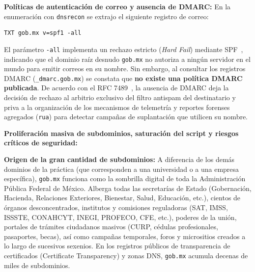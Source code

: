 \begin{itemizeColor}
    \item \textbf{Políticas de autenticación de correo y ausencia de DMARC:}
    En la enumeración con \texttt{dnsrecon} se extrajo el siguiente registro de correo:
\begin{lstlisting}
TXT gob.mx v=spf1 -all
\end{lstlisting}
    El parámetro \texttt{-all} implementa un rechazo estricto (\textit{Hard Fail}) mediante SPF~\cite{rfc7208_spf}, indicando que el dominio raíz desnudo \texttt{gob.mx} no autoriza a ningún servidor en el mundo para emitir correos en su nombre. Sin embargo, al consultar los registros DMARC (\texttt{\_dmarc.gob.mx}) se constata que \textbf{no existe una política DMARC publicada}. De acuerdo con el RFC 7489~\cite{rfc7489_dmarc}, la ausencia de DMARC deja la decisión de rechazo al arbitrio exclusivo del filtro antispam del destinatario y priva a la organización de los mecanismos de telemetría y reportes forenses agregados (\texttt{rua}) para detectar campañas de suplantación que utilicen su nombre.

    \item \textbf{Proliferación masiva de subdominios, saturación del script y riesgos críticos de seguridad:}
    \begin{itemizeColor}
        \item \textbf{Origen de la gran cantidad de subdominios:} 
        A diferencia de los demás dominios de la práctica (que corresponden a una universidad o a una empresa específica), \texttt{gob.mx} funciona como la sombrilla digital de toda la Administración Pública Federal de México. Alberga todas las secretarías de Estado (Gobernación, Hacienda, Relaciones Exteriores, Bienestar, Salud, Educación, etc.), cientos de órganos desconcentrados, institutos y comisiones reguladoras (SAT, IMSS, ISSSTE, CONAHCYT, INEGI, PROFECO, CFE, etc.), poderes de la unión, portales de trámites ciudadanos masivos (CURP, cédulas profesionales, pasaportes, becas), así como campañas temporales, foros y micrositios creados a lo largo de sucesivos sexenios. En los registros públicos de transparencia de certificados (Certificate Transparency) y zonas DNS, \texttt{gob.mx} acumula decenas de miles de subdominios.
        

\end{itemizeColor}
\end{itemizeColor}

